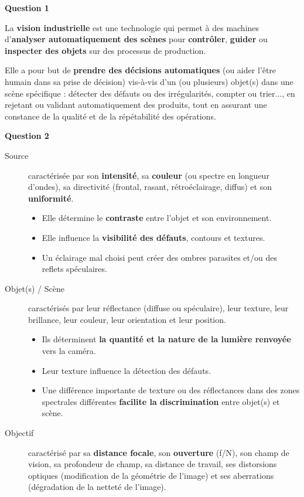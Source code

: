 \documentclass[a4paper,11pt,twoside]{book} %
\begin{document}
\textbf{Question 1}

La \textbf{vision industrielle} est une technologie qui permet à des machines d'\textbf{analyser automatiquement des scènes} pour \textbf{contrôler}, \textbf{guider} ou \textbf{inspecter des objets} sur des processus de production. 

Elle a pour but de \textbf{prendre des décisions automatiques} (ou aider l'être humain dans sa prise de décision) vis-à-vis d'un (ou plusieurs) objet(s) dans une scène spécifique : détecter des défauts ou des irrégularités, compter ou trier..., en rejetant ou validant automatiquement des produits, tout en assurant une
constance de la qualité et de la répétabilité des opérations.


\medskip
\textbf{Question 2}

\begin{description}
	\item[Source] caractérisée par son \textbf{intensité}, sa \textbf{couleur} (ou spectre en longueur d'ondes), sa directivité (frontal, rasant, rétroéclairage, diffus) et son \textbf{uniformité}. 
	\begin{itemize}
		\item Elle détermine le \textbf{contraste} entre l'objet et son environnement.
		\item Elle influence la \textbf{visibilité des défauts}, contours et textures.
		\item Un éclairage mal choisi peut créer des ombres parasites et/ou des reflets spéculaires.
	\end{itemize}		

	\item[Objet(s) / Scène] caractérisés par leur réflectance (diffuse ou spéculaire), leur texture, leur brillance, leur couleur, leur orientation et leur position.
	\begin{itemize}
		\item Ils déterminent \textbf{la quantité et la nature de la lumière renvoyée} vers la caméra.
		\item Leur texture influence la détection des défauts.
		\item Une différence importante de texture ou des réflectances dans des zones spectrales différentes \textbf{facilite la discrimination} entre objet(s) et scène.
	\end{itemize}

	\item[Objectif] caractérisé par sa \textbf{distance focale}, son \textbf{ouverture} (f/N), son champ de vision, sa profondeur de champ, sa distance de travail, ses distorsions optiques (modification de la géométrie de l'image) et ses aberrations (dégradation de la netteté de l'image).


\end{description}
\end{document}
